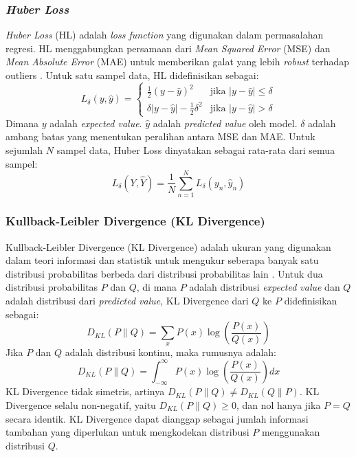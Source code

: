 \subsubsection{\textit{Huber Loss}}

\textit{Huber Loss} (HL) adalah \textit{loss function} yang digunakan dalam permasalahan regresi. HL menggabungkan persamaan dari \textit{Mean Squared Error} (MSE) dan \textit{Mean Absolute Error} (MAE) untuk memberikan galat yang lebih \textit{robust} terhadap outliers \cite{Bonaccorso2020-ec}. Untuk satu sampel data, HL didefinisikan sebagai:
\begin{equation}
    L_{\delta}(y, \hat{y}) = 
    \begin{cases} 
    \frac{1}{2}(y - \hat{y})^2 & \text{jika } |y - \hat{y}| \leq \delta \\
    \delta |y - \hat{y}| - \frac{1}{2}\delta^2 & \text{jika } |y - \hat{y}| > \delta
    \end{cases}
\end{equation}
Dimana \(y\) adalah \textit{expected value}. \(\hat{y}\) adalah \textit{predicted value} oleh model. \(\delta\) adalah ambang batas yang menentukan peralihan antara MSE dan MAE. Untuk sejumlah \(N\) sampel data, Huber Loss dinyatakan sebagai rata-rata dari semua sampel:
\begin{equation}
    L_{\delta}(Y, \hat{Y}) = \frac{1}{N} \sum_{n=1}^{N} L_{\delta}(y_n, \hat{y}_n)
\end{equation}

\subsubsection{Kullback-Leibler Divergence (KL Divergence)}

Kullback-Leibler Divergence (KL Divergence) adalah ukuran yang digunakan dalam teori informasi dan statistik untuk mengukur seberapa banyak satu distribusi probabilitas berbeda dari distribusi probabilitas lain \cite{Bonaccorso2020-ec}. Untuk dua distribusi probabilitas \(P\) dan \(Q\), di mana \(P\) adalah distribusi \textit{expected value} dan \(Q\) adalah distribusi dari \textit{predicted value}, KL Divergence dari \(Q\) ke \(P\) didefinisikan sebagai:
\begin{equation}
    D_{KL}(P \parallel Q) = \sum_{x} P(x) \log \left( \frac{P(x)}{Q(x)} \right)
\end{equation}
Jika \(P\) dan \(Q\) adalah distribusi kontinu, maka rumusnya adalah:
\begin{equation}
    D_{KL}(P \parallel Q) = \int_{-\infty}^{\infty} P(x) \log \left( \frac{P(x)}{Q(x)} \right) dx
\end{equation}
KL Divergence tidak simetris, artinya \(D_{KL}(P \parallel Q) \neq D_{KL}(Q \parallel P)\). KL Divergence selalu non-negatif, yaitu \(D_{KL}(P \parallel Q) \geq 0\), dan nol hanya jika \(P = Q\) secara identik. KL Divergence dapat dianggap sebagai jumlah informasi tambahan yang diperlukan untuk mengkodekan distribusi \(P\) menggunakan distribusi \(Q\).


